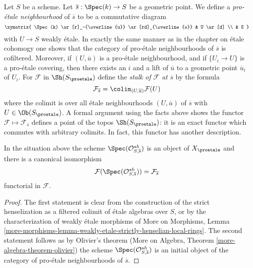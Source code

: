 \noindent
Let $S$ be a scheme. Let $\overline{s} : \Spec(k) \to S$ be a geometric
point. We define a {\it pro-\'etale neighbourhood} of $\overline{s}$
to be a commutative diagram
$$
\xymatrix{
\Spec(k) \ar[r]_-{\overline{u}} \ar[rd]_{\overline{s}} & U \ar[d] \\
& S
}
$$
with $U \to S$ weakly \'etale. In exactly the same manner as in the
chapter on \'etale cohomogy one shows that the category of pro-\'etale
neighbourhoods of $\overline{s}$ is cofiltered. Moreover, if
$(U, \overline{u})$ is a pro-\'etale neighbourhood, and if $\{U_i \to U\}$
is a pro-\'etale covering, then there exists an $i$ and a lift of
$\overline{u}$ to a geometric point $\overline{u}_i$ of $U_i$.
For $\mathcal{F}$ in $\Sh(S_\proetale)$ define the {\it stalk
of $\mathcal{F}$ at $\overline{s}$} by the formula
$$
\mathcal{F}_{\overline{s}} = \colim_{(U, \overline{u})} \mathcal{F}(U)
$$
where the colimit is over all \'etale neighbourhoods $(U, \overline{u})$
of $\overline{s}$ with $U \in \Ob(S_\proetale)$.
A formal argument using the facts above shows the functor
$\mathcal{F} \mapsto \mathcal{F}_{\overline{s}}$
defines a point of the topos $\Sh(S_\proetale)$:
it is an exact functor which commutes with arbitrary colimits.
In fact, this functor has another description.

\begin{lemma}
\label{lemma-classical-point}
In the situation above the scheme $\Spec(\mathcal{O}_{S, \overline{s}}^{sh})$
is an object of $X_\proetale$ and there is a canonical isomorphism
$$
\mathcal{F}(\Spec(\mathcal{O}_{S, \overline{s}}^{sh})) =
\mathcal{F}_{\overline{s}}
$$
functorial in $\mathcal{F}$.
\end{lemma}

\begin{proof}
The first statement is clear from the construction of the strict henselization
as a filtered colimit of \'etale algebras over $S$, or by the characterization
of weakly \'etale morphisms of
More on Morphisms, Lemma
\ref{more-morphisms-lemma-weakly-etale-strictly-henselian-local-rings}.
The second statement follows as by Olivier's theorem
(More on Algebra, Theorem \ref{more-algebra-theorem-olivier})
the scheme $\Spec(\mathcal{O}_{S, \overline{s}}^{sh})$
is an initial object of the category of pro-\'etale neighbourhoods
of $\overline{s}$.
\end{proof}

